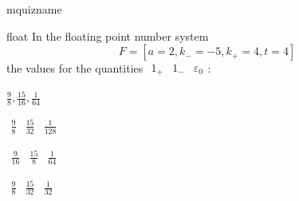 \documentclass[12pt]{article}
\begin{document}
\begin{quiz}{mquizname}


\begin{multi}{float}
In the floating point number system $$  F=\left[ a=2, k_{-}=-5, k_{+}=4, t=4 \right]  $$ the values for the quantities 
$ {\begin{array}{ccc}1_{+}& 1_{-}& \varepsilon_{0}\end{array}} $:
\item* $ \frac{9}{8}, \frac{15}{16}, \frac{1}{64} $
\item  $ {\begin{array}{ccc}\frac{9}{8}& \frac{15}{32}& \frac{1}{128}\end{array}} $
\item  $ {\begin{array}{ccc}\frac{9}{16}& \frac{15}{8}& \frac{1}{64}\end{array}} $
\item  $ {\begin{array}{ccc}\frac{9}{8}& \frac{15}{32}& \frac{1}{32}\end{array}} $
\end{multi}

\end{quiz}
\end{document}

